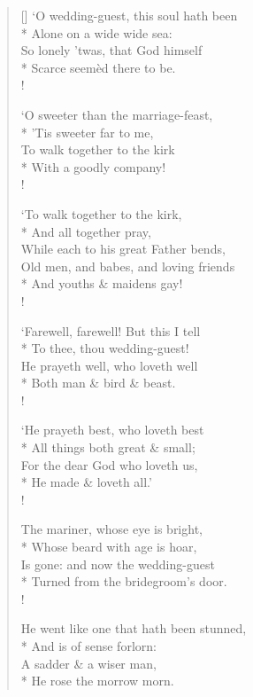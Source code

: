 \documentclass[MAIN]{subfiles}
\begin{document}
\begin{verse}[\versewidth]
`O wedding-guest, this soul hath been\\* 
\vin Alone on a wide wide sea:\\
So lonely 'twas, that God himself\\*
\vin Scarce seem\`ed there to be.\\!

`O sweeter than the marriage-feast,\\*
\vin 'Tis sweeter far to me,\\
To walk together to the kirk\\*
\vin With a goodly company!\\!

`To walk together to the kirk,\\*
\vin And all together pray,\\
While each to his great Father bends,\\
Old men, and babes, and loving friends\\*
\vin And youths \& maidens gay!\\!

`Farewell, farewell! But this I tell\\*
\vin To thee, thou wedding-guest!\\
He prayeth well, who loveth well\\*
\vin Both man \& bird \& beast.\\!

`He prayeth best, who loveth best\\*
\vin All things both great \& small;\\
For the dear God who loveth us,\\*
\vin He made \& loveth all.'\\!

The mariner, whose eye is bright,\\*
\vin Whose beard with age is hoar,\\
Is gone: and now the wedding-guest\\*
\vin Turned from the bridegroom's door.\\!

He went like one that hath been stunned,\\*
\vin And is of sense forlorn:\\
A sadder \& a wiser man,\\*
\vin He rose the morrow morn.
\end{verse}
\end{document}

